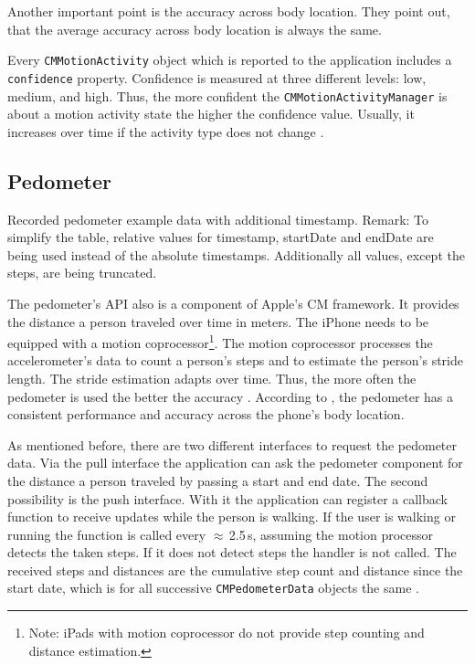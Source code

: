 Another important point is the accuracy across body location. They point out, that the average accuracy across body location is always the same.

Every \texttt{CMMotionActivity} object which is reported to the application includes a \texttt{confidence} property. Confidence is measured at three different levels: low, medium, and high. Thus, the more confident the \texttt{CMMotionActivityManager} is about a motion activity state the higher the confidence value. Usually, it increases over time if the activity type does not change \citep{apple:wwdc_2014_pham,apple:ios_doc_cm}.


\subsection{Pedometer}
\begin{table}
	
	\caption{Recorded pedometer example data with additional timestamp. Remark: To simplify the table, relative values for timestamp, startDate and endDate are being used instead of the absolute timestamps. Additionally all values, except the steps, are being truncated.}
	\label{tab:pedometerExampleData}
\end{table}

The pedometer's \acs{API} also is a component of Apple's \acs{CM} framework. It provides the distance a person traveled over time in meters. The iPhone needs to be equipped with a motion coprocessor\footnote{Note: iPads with motion coprocessor do not provide step counting and distance estimation.}. The motion coprocessor processes the accelerometer's data to count a person's steps and to estimate the person's stride length. The stride estimation adapts over time. Thus, the more often the pedometer is used the better the accuracy \citep{apple:wwdc_2014_pham}. According to \citet{apple:wwdc_2014_pham}, the pedometer has a consistent performance and accuracy across the phone's body location.

As mentioned before, there are two different interfaces to request the pedometer data. Via the pull interface the application can ask the pedometer component for the distance a person traveled by passing a start and end date. The second possibility is the push interface. With it the application can register a callback function to receive updates while the person is walking. If the user is walking or running the function is called every $\approx$\,2.5\,s, assuming the motion processor detects the taken steps. If it does not detect steps the handler is not called. The received steps and distances are the cumulative step count and distance since the start date, which is for all successive \texttt{CMPedometerData} objects the same \citep{apple:wwdc_2014_pham}.

